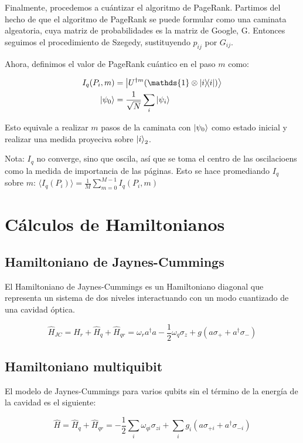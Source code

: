 \documentclass[11pt, spanish]{report}
\begin{document}
Finalmente, procedemos a cuántizar el algoritmo de PageRank. Partimos del hecho de que el algoritmo de PageRank se puede formular como una caminata algeatoria, cuya matriz de probabilidades es la matriz de Google, G. Entonces seguimos el procedimiento de Szegedy, sustituyendo $p_{i j}$ por $G_{i j}$.

Ahora, definimos el valor de PageRank cuántico en el paso $m$ como:

\begin{align*}
I_q(P_i,m) &= \ket{U^{\dagger m}(\mathds{1} \otimes \ketbra{i}{i})} \\
\ket{\psi_0} &= \frac{1}{\sqrt{N}} \sum\limits_i \ket{\psi_i}
\end{align*}

Esto equivale a realizar $m$ pasos de la caminata con $\ket{\psi_0}$ como estado inicial y realizar una medida proyeciva sobre $\ket{i}_2$.

Nota: $I_q$ no converge, sino que oscila, así que se toma el centro de las oscilacioens como la medida de importancia de las páginas. Esto se hace promediando $I_q$ sobre $m$: $\langle I_q(P_i) \rangle = \frac{1}{M} \sum\limits_{m=0}^{M-1} I_q(P_i,m)$ 


\appendix
\chapter{Cálculos de Hamiltonianos}

\section{Hamiltoniano de Jaynes-Cummings}

El Hamiltoniano de Jaynes-Cummings es un Hamiltoniano diagonal que representa un
sistema de dos niveles interactuando con un modo cuantizado de una cavidad óptica.

$$\hat{H}_{JC} = \hat{H}_r + \hat{H}_q + \hat{H}_{qr} = \omega_r a^\dag a - \frac{1}{2} \omega_q \sigma_z + g(a \sigma_+ + a^\dag \sigma_-)$$

\section{Hamiltoniano multiquibit}

El modelo de Jaynes-Cummings para varios qubits sin el término de la energía de la cavidad es el siguiente:

$$\hat{H} = \hat{H}_q + \hat{H}_{qr} = - \frac{1}{2} \sum\limits_i \omega_{qi} \sigma_{zi} + \sum\limits_i g_i (a \sigma_{+ i} + a^\dagger \sigma_{- i})$$
\end{document}

